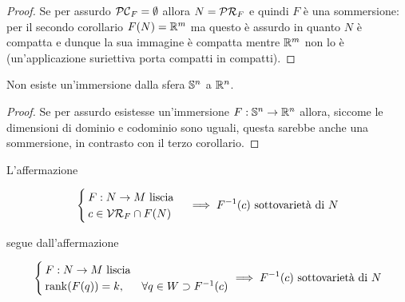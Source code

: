 \begin{proof}
	Se per assurdo $ \PC_{F} = \emptyset $ allora $ N = \PR_{F} $ e quindi $ F $ è una sommersione: per il secondo corollario $ F(N) = \R^{m} $ ma questo è assurdo in quanto $ N $ è compatta e dunque la sua immagine è compatta mentre $ \R^{m} $ non lo è (un'applicazione suriettiva porta compatti in compatti).
\end{proof}

\begin{corollary}\label{imm_sph}
	Non esiste un'immersione dalla sfera $ \S^{n} $ a $ \R^{n} $.
\end{corollary}

\begin{proof}
	Se per assurdo esistesse un'immersione $ F : \S^{n} \to \R^{n} $ allora, siccome le dimensioni di dominio e codominio sono uguali, questa sarebbe anche una sommersione, in contrasto con il terzo corollario.
\end{proof}

\begin{remark}
	L'affermazione

	\begin{equation}
		\begin{cases}
			F : N \to M \text{ liscia} \\
			c \in \VR_{F} \cap F(N)
		\end{cases} %
		\implies %
		F^{-1}(c) \text{ sottovarietà di } N
	\end{equation}

	segue dall'affermazione
	
	\begin{equation}
		\begin{cases}
			F : N \to M \text{ liscia} \\
			\rank(F(q)) = k, & \forall q \in W \supset F^{-1}(c)
		\end{cases} %
		\implies %
		F^{-1}(c) \text{ sottovarietà di } N
	\end{equation}
\end{remark}

